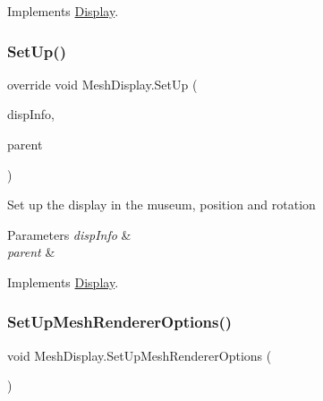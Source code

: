 Implements \mbox{\hyperlink{class_display_a81f07350cf50b3924f4fe269e1b4cf17}{Display}}.

\mbox{\label{class_mesh_display_adb19ca4d076a93df64d1c035663fce0f}} 
\subsubsection{\texorpdfstring{Set\+Up()}{SetUp()}}
{\footnotesize\ttfamily override void Mesh\+Display.\+Set\+Up (\begin{DoxyParamCaption}\item[{\mbox{\hyperlink{class_museum_display_info}{Museum\+Display\+Info}}}]{disp\+Info,  }\item[{Game\+Object}]{parent }\end{DoxyParamCaption})\hspace{0.3cm}{\ttfamily [virtual]}}



Set up the display in the museum, position and rotation 


\begin{DoxyParams}{Parameters}
{\em disp\+Info} & \\
\hline
{\em parent} & \\
\hline
\end{DoxyParams}


Implements \mbox{\hyperlink{class_display_a57325251fbeac943cd48520e50f0bec4}{Display}}.

\mbox{\label{class_mesh_display_ab87e001316410059093fac5d92326ef2}} 
\subsubsection{\texorpdfstring{Set\+Up\+Mesh\+Renderer\+Options()}{SetUpMeshRendererOptions()}}
{\footnotesize\ttfamily void Mesh\+Display.\+Set\+Up\+Mesh\+Renderer\+Options (\begin{DoxyParamCaption}{ }\end{DoxyParamCaption})\hspace{0.3cm}{\ttfamily [private]}}



